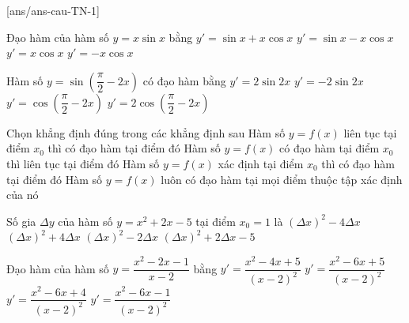 
\caulc
{}[ans/ans-cau-TN-1]

\begin{ex}%
	Đạo hàm của hàm số $y = x\sin x$ bằng
		\choice
		{\True $y' = \sin x + x\cos x$}
		{$y' = \sin x - x\cos x$}
		{$y' = x\cos x$}
		{$y' =  - x\cos x$}
	\end{ex}

\begin{ex}%
	Hàm số $y = \sin \left( \dfrac{\pi }{2} - 2x \right)$ có đạo hàm bằng
	\choice
	{$y' = 2\sin 2x$}
	{\True $y' =  - 2\sin 2x$}
	{$y' = \cos \left( \dfrac{\pi }{2} - 2x \right)$}
	{$y' = 2\cos \left( \dfrac{\pi }{2} - 2x \right)$}
\end{ex}



\begin{ex}%
	Chọn khẳng định đúng trong các khẳng định sau
	\choice
	{Hàm số $y=f(x)$ liên tục tại điểm $x_0$ thì có đạo hàm tại điểm đó}
	{\True Hàm số $y=f(x)$ có đạo hàm tại điểm $x_0$ thì liên tục tại điểm đó}
	{Hàm số $y=f(x)$ xác định tại điểm $x_0$ thì có đạo hàm tại điểm đó}
	{Hàm số $y=f(x)$ luôn có đạo hàm tại mọi điểm thuộc tập xác định của nó}
\end{ex}

\begin{ex}%
	Số gia $\Delta y$ của hàm số $y = x^2 + 2x - 5$ tại điểm $x_0 = 1$ là
	\choice
	{$(\Delta x)^2 - 4\Delta x$}
	{\True $\left( \Delta x \right)^2 + 4\Delta x$}
	{$\left(\Delta x \right)^2 - 2\Delta x$}
	{$\left( \Delta x \right)^2 + 2\Delta x - 5$}
\end{ex}

\begin{ex}%
	Đạo hàm của hàm số $y = \dfrac{x^2 - 2x - 1}{x - 2}$ bằng 
	\choice
	{\True $y' = \dfrac{x^2 - 4x + 5}{(x - 2)^2}$}
	{$y' = \dfrac{x^2 - 6x + 5}{(x - 2)^2}$}
	{$y' = \dfrac{x^2 - 6x + 4}{(x - 2)^2}$}
	{$y' = \dfrac{x^2 - 6x - 1}{(x - 2)^2}$}
\end{ex}

